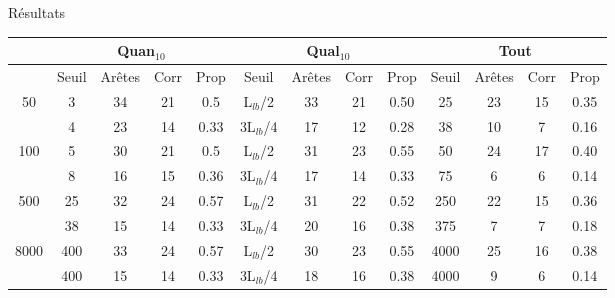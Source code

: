 \documentclass{beamer}
\begin{document}
\begin{frame}{Résultats}

\begin{table}[H]

\begin{tabular}{|@{}c@{}|@{}c@{}|@{}c@{}|@{}c@{}|@{}c@{}||@{}c@{}|@{}c@{}|@{}c@{}|@{}c@{}||@{}c@{}|@{}c@{}|@{}c@{}|@{}c@{}|}

\hline
 & \multicolumn{4}{c|}{Quan$_{10}$} & \multicolumn{4}{c|}{Qual$_{10}$} & \multicolumn{4}{c|}{Tout} \\
 \hline
 & Seuil & Arêtes & Corr & Prop & Seuil & Arêtes & Corr & Prop & Seuil & Arêtes & Corr & Prop \\
 \hline
 50 & 3 & 34 & 21 & 0.5 & L$_{lb}$/2 & 33 & 21 & 0.50 & 25 & 23 & 15 & 0.35 \\
 \cline{2-13} 
    & 4 & 23 & 14 & 0.33 & 3L$_{lb}$/4 & 17 & 12 & 0.28 & 38 & 10 & 7 & 0.16 \\
  \hline
   100 & 5 & 30 & 21 & 0.5 & L$_{lb}$/2 & 31 & 23 & 0.55 & 50 & 24 & 17 & 0.40 \\
 \cline{2-13} 
    & 8 & 16 & 15 & 0.36 & 3L$_{lb}$/4 & 17 & 14 & 0.33 & 75 & 6 & 6 & 0.14 \\
  \hline
   500 & 25 & 32 & 24 & 0.57 & L$_{lb}$/2 & 31 & 22 & 0.52 & 250 & 22 & 15 & 0.36 \\
 \cline{2-13} 
    & 38 & 15 & 14 & 0.33 & 3L$_{lb}$/4 & 20 & 16 & 0.38 & 375 & 7 & 7 & 0.18 \\
  \hline
   8000 & 400 & 33 & 24 & 0.57 & L$_{lb}$/2 & 30 & 23 & 0.55 & 4000 & 25 & 16 & 0.38 \\
 \cline{2-13} 
    & 400 & 15 & 14 & 0.33 & 3L$_{lb}$/4 & 18 & 16 & 0.38 & 4000 & 9 & 6 & 0.14 \\
  \hline

\end{tabular}


\end{table}
\end{frame}
\end{document}
